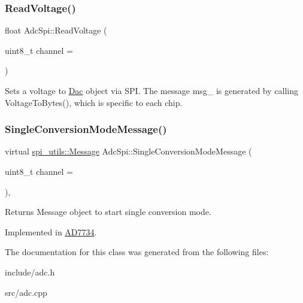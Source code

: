 \mbox{\label{classAdcSpi_aa245df90e70654aabc64f88107ccd804}} 
\subsubsection{\texorpdfstring{Read\+Voltage()}{ReadVoltage()}}
{\footnotesize\ttfamily float Adc\+Spi\+::\+Read\+Voltage (\begin{DoxyParamCaption}\item[{uint8\+\_\+t}]{channel = {} }\end{DoxyParamCaption})}

Sets a voltage to \mbox{\hyperlink{classDac}{Dac}} object via S\+PI. The message msg\+\_\+ is generated by calling Voltage\+To\+Bytes(), which is specific to each chip. \mbox{\label{classAdcSpi_a369da36232861640a113792d2398ce44}} 
\subsubsection{\texorpdfstring{Single\+Conversion\+Mode\+Message()}{SingleConversionModeMessage()}}
{\footnotesize\ttfamily virtual \mbox{\hyperlink{structspi__utils_1_1Message}{spi\+\_\+utils\+::\+Message}} Adc\+Spi\+::\+Single\+Conversion\+Mode\+Message (\begin{DoxyParamCaption}\item[{uint8\+\_\+t}]{channel = {} }\end{DoxyParamCaption})\hspace{0.3cm}{\ttfamily [protected]}, {}}

Returns Message object to start single conversion mode. 

Implemented in \mbox{\hyperlink{classAD7734_af677fbfbae0ec1c78b453ceb4a6736ec}{A\+D7734}}.



The documentation for this class was generated from the following files\+:\begin{DoxyCompactItemize}
\item 
include/adc.\+h\item 
src/adc.\+cpp\end{DoxyCompactItemize}
